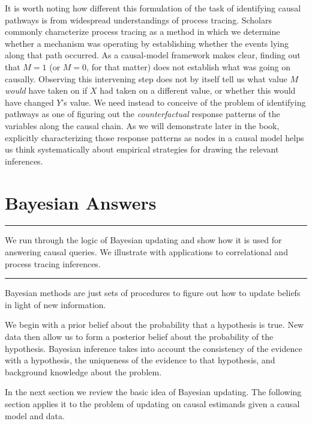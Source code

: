 \documentclass[
  12pt,
]{book}
\begin{document}
It is worth noting how different this formulation of the task of identifying causal pathways is from widespread understandings of process tracing. Scholars commonly characterize process tracing as a method in which we determine whether a mechanism was operating by establishing whether the events lying along that path occurred. As a causal-model framework makes clear, finding out that \(M=1\) (or \(M=0\), for that matter) does not establish what was going on causally. Observing this intervening step does not by itself tell us what value \(M\) \emph{would} have taken on if \(X\) had taken on a different value, or whether this would have changed \(Y\)'s value. We need instead to conceive of the problem of identifying pathways as one of figuring out the \emph{counterfactual} response patterns of the variables along the causal chain. As we will demonstrate later in the book, explicitly characterizing those response patterns as nodes in a causal model helps us think systematically about empirical strategies for drawing the relevant inferences.

\hypertarget{bayeschapter}{%
\chapter{Bayesian Answers}\label{bayeschapter}}

\begin{center}\rule{0.5\linewidth}{0.5pt}\end{center}

We run through the logic of Bayesian updating and show how it is used for answering causal queries. We illustrate with applications to correlational and process tracing inferences.

\begin{center}\rule{0.5\linewidth}{0.5pt}\end{center}

Bayesian methods are just sets of procedures to figure out how to update beliefs in light of new information.

We begin with a prior belief about the probability that a hypothesis is true. New data then allow us to form a posterior belief about the probability of the hypothesis. Bayesian inference takes into account the consistency of the evidence with a hypothesis, the uniqueness of the evidence to that hypothesis, and background knowledge about the problem.

In the next section we review the basic idea of Bayesian updating. The following section applies it to the problem of updating on causal estimands given a causal model and data.
\end{document}

